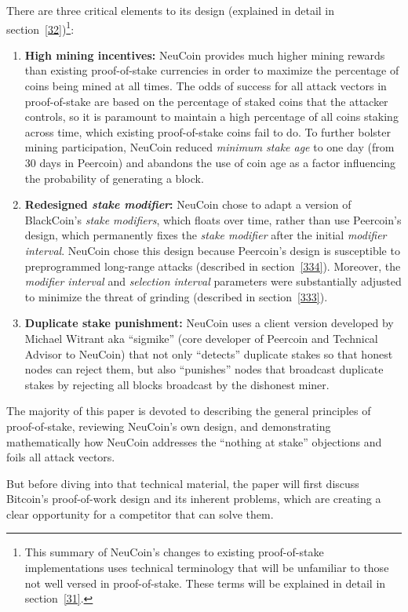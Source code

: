 \documentclass[a4paper,11pt]{article}
\begin{document}
There are three critical elements to its design (explained in detail in section~\ref{32})\footnote{This summary of NeuCoin's changes to existing proof-of-stake implementations uses technical terminology that will be unfamiliar to those not well versed in proof-of-stake. These terms will be explained in detail in section~\ref{31}.}:
\begin{enumerate}
\setlength{\itemsep}{0pt}
\item{\textbf{High mining incentives:} NeuCoin provides much higher mining rewards than existing proof-of-stake currencies in order to maximize the percentage of coins being mined at all times. The odds of success for all attack vectors in proof-of-stake are based on the percentage of staked coins that the attacker controls, so it is paramount to maintain a high percentage of all coins staking across time, which existing proof-of-stake coins fail to do. To further bolster mining participation, NeuCoin reduced \textit{minimum stake age} to one day (from 30 days in Peercoin) and abandons the use of coin age as a factor influencing the probability of generating a block.}
\item{\textbf{Redesigned \textit{stake modifier}:} NeuCoin chose to adapt a version of BlackCoin's \textit{stake modifiers}, which floats over time, rather than use Peercoin's design, which permanently fixes the \textit{stake modifier} after the initial \textit{modifier interval}. NeuCoin chose this design because Peercoin's design is susceptible to preprogrammed long-range attacks (described in section~\ref{334}). Moreover, the \textit{modifier interval} and \textit{selection interval} parameters were substantially adjusted to minimize the threat of grinding (described in section~\ref{333}).}
\item{\textbf{Duplicate stake punishment:} NeuCoin uses a client version developed by Michael Witrant aka ``sigmike'' (core developer of Peercoin and Technical Advisor to NeuCoin) that not only “detects” duplicate stakes so that honest nodes can reject them, but also “punishes” nodes that broadcast duplicate stakes by rejecting all blocks broadcast by the dishonest miner. }
\end{enumerate}

The majority of this paper is devoted to describing the general principles of proof-of-stake, reviewing NeuCoin's own design, and demonstrating mathematically how NeuCoin addresses the ``nothing at stake'' objections and foils all attack vectors. 
 
But before diving into that technical material, the paper will first discuss Bitcoin's proof-of-work design and its inherent problems, which are creating a clear opportunity for a competitor that can solve them.
\end{document}
